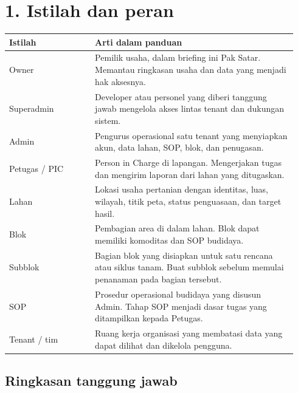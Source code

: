 \documentclass[11pt,a4paper]{article}
\begin{document}
\section{1. Istilah dan peran}

\begin{longtable}{p{0.28\linewidth}p{0.66\linewidth}}\toprule

Istilah & Arti dalam panduan \\

\midrule

Owner & Pemilik usaha, dalam briefing ini Pak Satar. Memantau ringkasan usaha dan data yang menjadi hak aksesnya. \\

Superadmin & Developer atau personel yang diberi tanggung jawab mengelola akses lintas tenant dan dukungan sistem. \\

Admin & Pengurus operasional satu tenant yang menyiapkan akun, data lahan, SOP, blok, dan penugasan. \\

Petugas / PIC & Person in Charge di lapangan. Mengerjakan tugas dan mengirim laporan dari lahan yang ditugaskan. \\

Lahan & Lokasi usaha pertanian dengan identitas, luas, wilayah, titik peta, status penguasaan, dan target hasil. \\

Blok & Pembagian area di dalam lahan. Blok dapat memiliki komoditas dan SOP budidaya. \\

Subblok & Bagian blok yang disiapkan untuk satu rencana atau siklus tanam. Buat subblok sebelum memulai penanaman pada bagian tersebut. \\

SOP & Prosedur operasional budidaya yang disusun Admin. Tahap SOP menjadi dasar tugas yang ditampilkan kepada Petugas. \\

Tenant / tim & Ruang kerja organisasi yang membatasi data yang dapat dilihat dan dikelola pengguna. \\

\bottomrule\end{longtable}

\subsection{Ringkasan tanggung jawab}
\end{document}
